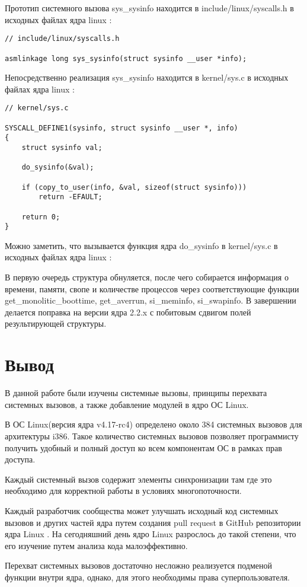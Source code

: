 \documentclass[14pt,a4paper,report]{report}
\begin{document}
Прототип системного вызова sys\_sysinfo находится в include/linux/syscalls.h в исходных файлах ядра linux \cite{cite-linux-syscalls}:

\begin{lstlisting}
// include/linux/syscalls.h

asmlinkage long sys_sysinfo(struct sysinfo __user *info);
\end{lstlisting}

Непосредственно реализация sys\_sysinfo находится в kernel/sys.c в исходных файлах ядра linux \cite{cite-linux-sys}:

\begin{lstlisting}
// kernel/sys.c

SYSCALL_DEFINE1(sysinfo, struct sysinfo __user *, info)
{
    struct sysinfo val;
    
    do_sysinfo(&val);
    
    if (copy_to_user(info, &val, sizeof(struct sysinfo)))
        return -EFAULT;
    
    return 0;
}
\end{lstlisting}

Можно заметить, что вызывается функция ядра do\_sysinfo в kernel/sys.c в исходных файлах ядра linux \cite{cite-linux-sys}:



В первую очередь структура обнуляется, после чего собирается информация о времени, памяти, свопе и количестве процессов через соответствующие функции get\_monolitic\_boottime, get\_averrun, si\_meminfo, si\_swapinfo. В завершении делается поправка на версии ядра 2.2.x с побитовым сдвигом полей результирующей структуры.

\section{Вывод}

В данной работе были изучены системные вызовы, принципы перехвата системных вызовов, а также добавление модулей в ядро ОС Linux.

В ОС Linux(версия ядра v4.17-rc4) определено около 384 системных вызовов для архитектуры i386. Такое количество системных вызовов позволяет программисту получить удобный и полный доступ ко всем компонентам ОС в рамках прав доступа.

Каждый системный вызов содержит элементы синхронизации там где это необходимо для корректной работы в условиях многопоточности.

Каждый разработчик сообщества может улучшать исходный код системных вызовов и других частей ядра путем создания pull request в GitHub репозитории ядра Linux \cite{cite-linux}. На сегодняшний день ядро Linux разрослось до такой степени, что его изучение путем анализа кода малоэффективно.

Перехват системных вызовов достаточно несложно реализуется подменой функции внутри ядра, однако, для этого необходимы права суперпользователя.



\end{document}
